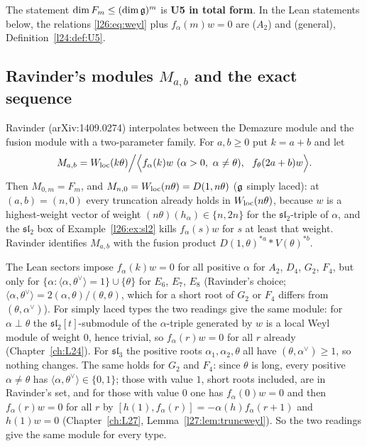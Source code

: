 The statement $\dim F_m\le(\dim\mathfrak g)^m$ is \textbf{U5 in total form}. In the Lean statements below, the
relations \eqref{l26:eq:weyl} plus $f_\alpha(m)w=0$ are  ($A_2$) and 
(general), Definition~\ref{l24:def:U5}.

\subsection{Ravinder's modules $M_{a,b}$ and the exact sequence}\label{l26:sec:ravinder}

Ravinder (arXiv:1409.0274) interpolates between the Demazure module and the fusion module with a two-parameter family.
For $a,b\ge0$ put $k=a+b$ and let
\begin{equation}\label{l26:eq:Mab}
M_{a,b}=\ltwentysixWloc(k\theta)\Big/\Bigl\langle f_\alpha(k)w\ (\alpha>0,\ \alpha\neq\theta),\ \ f_\theta(2a+b)w\Bigr\rangle .
\end{equation}
Then $M_{0,m}=F_m$, and $M_{n,0}=W_{\mathrm{loc}}(n\theta)=D(1,n\theta)$ ($\mathfrak g$ simply laced): at $(a,b)=(n,0)$
every truncation already holds in $W_{\mathrm{loc}}(n\theta)$, because $w$ is a highest-weight vector of weight
$(n\theta)(h_\alpha)\in\{n,2n\}$ for the $\mathfrak{sl}_2$-triple of $\alpha$, and the $\mathfrak{sl}_2$ box of
Example~\ref{l26:ex:sl2} kills $f_\alpha(s)w$ for $s$ at least that weight. Ravinder identifies $M_{a,b}$ with the
fusion product $D(1,\theta)^{*a}*V(\theta)^{*b}$.

\begin{remark}\label{l26:rem:fusionset}
The Lean sectors impose $f_\alpha(k)w=0$ for all positive $\alpha$ for $A_2$, $D_4$, $G_2$, $F_4$, but only for
$\{\alpha:\langle\alpha,\theta^\vee\rangle=1\}\cup\{\theta\}$ for $E_6$, $E_7$, $E_8$ (Ravinder's choice;
$\langle\alpha,\theta^\vee\rangle=2(\alpha,\theta)/(\theta,\theta)$, which for a short root of $G_2$ or $F_4$ differs from
$(\theta,\alpha^\vee)$). For simply laced types the two
readings give the same module: for $\alpha\perp\theta$ the $\mathfrak{sl}_2[t]$-submodule of the $\alpha$-triple generated by $w$
is a local Weyl module of weight $0$, hence trivial, so $f_\alpha(r)w=0$ for all $r$ already (Chapter~\ref{ch:L24}). For
$\mathfrak{sl}_3$ the positive roots $\alpha_1,\alpha_2,\theta$ all have $(\theta,\alpha^\vee)\ge1$, so nothing changes. The same
holds for $G_2$ and $F_4$: since $\theta$ is long, every positive $\alpha\neq\theta$ has $\langle\alpha,\theta^\vee\rangle\in\{0,1\}$; those
with value $1$, short roots included, are in Ravinder's set, and for those with value $0$ one has $f_\alpha(0)w=0$ and then
$f_\alpha(r)w=0$ for all $r$ by $[h(1),f_\alpha(r)]=-\alpha(h)f_\alpha(r+1)$ and $h(1)w=0$ (Chapter~\ref{ch:L27},
Lemma~\ref{l27:lem:truncweyl}). So the two readings give the same module for every type.
\end{remark}

